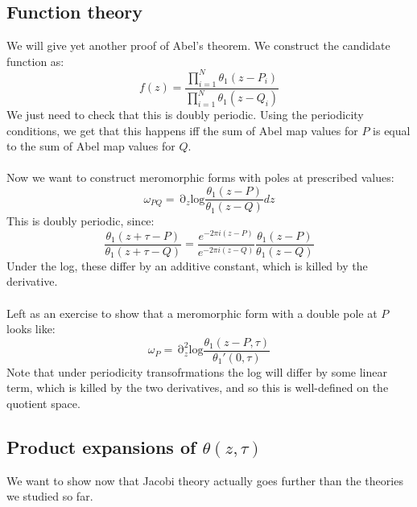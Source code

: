 \documentclass[12 pt]{article}
\DeclareMathOperator {\p} {\partial}
\theoremstyle{plain}
\theoremstyle{definition}
\theoremstyle{remark}
\begin{document}
\subsection*{Function theory}
We will give yet another proof of Abel's theorem. We construct the candidate function as:
\[   f(z) = \frac{\prod_{i=1}^N \theta_1(z - P_i)}{\prod_{i=1}^N \theta_1(z - Q_i)}     \]
We just need to check that this is doubly periodic. Using the periodicity conditions, we get that this happens iff the sum of Abel map values for $P$ is equal to the sum of Abel map values for $Q$.
\\
\\
Now we want to construct meromorphic forms with poles at prescribed values:
\[      \omega_{PQ} = \p_z \text{log} \frac{\theta_1(z - P)}{\theta_1(z - Q)} dz     \]
This is doubly periodic, since:
\[   \frac{\theta_1(z + \tau - P)}{\theta_1(z + \tau - Q)} = \frac{e^{-2\pi i (z-P)}}{e^{-2\pi i (z-Q)}} \frac{\theta_1(z - P)}{\theta_1(z - Q)}   \]
Under the log, these differ by an additive constant, which is killed by the derivative.
\\
\\
Left as an exercise to show that a meromorphic form with a double pole at $P$ looks like:
\[  \omega_P = \p_z^2 \text{log} \frac{\theta_1(z - P, \tau)}{\theta_1'(0,\tau)}  \]
Note that under periodicity transofrmations the log will differ by some linear term, which is killed by the two derivatives, and so this is well-defined on the quotient space.

\subsection*{Product expansions of $\theta(z, \tau)$}
We want to show now that Jacobi theory actually goes further than the theories we studied so far. 
\end{document}
